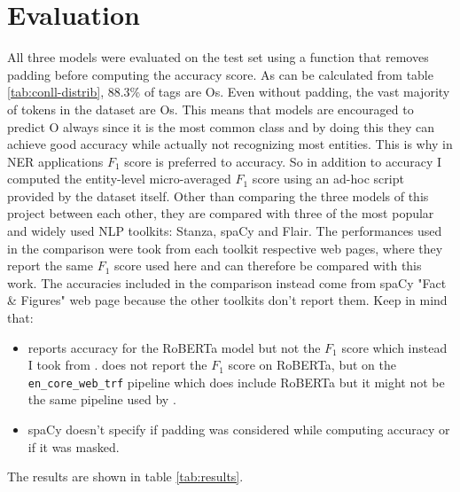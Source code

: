 \documentclass[journal]{IEEEtran}
\begin{document}
\section{Evaluation}
All three models were evaluated on the test set using a function that removes padding before computing the accuracy score.
As can be calculated from table \ref{tab:conll-distrib}, 88.3\% of tags are Os. Even without padding, the vast majority of tokens in the dataset are Os. This means that models are encouraged to predict O always since it is the most common class and by doing this they can achieve good accuracy while actually not recognizing most entities. 
This is why in NER applications $F_1$ score is preferred to accuracy. So in addition to accuracy I computed the entity-level micro-averaged $F_1$ score using an ad-hoc script provided by the dataset itself. 
Other than comparing the three models of this project between each other, they are compared with three of the most popular and widely used NLP toolkits: Stanza, spaCy and Flair. 
The performances used in the comparison were took from each toolkit respective web pages, where they report the same $F_1$ score used here and can therefore be compared with this work.
The accuracies included in the comparison instead come from spaCy "Fact \& Figures" \cite{spacyfig} web page because the other toolkits don't report them. Keep in mind that:

\begin{itemize}
    \item \cite{spacyfig} reports accuracy for the RoBERTa model but not the $F_1$ score which instead I took from \cite{spacyhugging}. \cite{spacyhugging} does not report the $F_1$ score on RoBERTa, but on the \texttt{en\_core\_web\_trf} pipeline which does include RoBERTa but it might not be the same pipeline used by \cite{spacyfig}.
    \item spaCy doesn't specify if padding was considered while computing accuracy or if it was masked.
\end{itemize}

\noindent The results are shown in table \ref{tab:results}.
\end{document}

